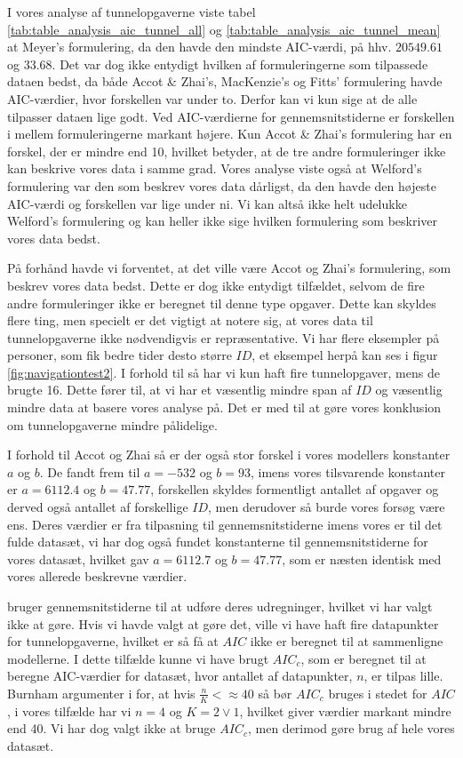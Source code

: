 I vores analyse af tunnelopgaverne viste tabel \ref{tab:table_analysis_aic_tunnel_all} og \ref{tab:table_analysis_aic_tunnel_mean} at Meyer's formulering, da den havde den mindste AIC-værdi, på hhv. $20549.61$ og $33.68$. Det var dog ikke entydigt hvilken af formuleringerne som tilpassede dataen bedst, da både Accot \& Zhai's, MacKenzie's og Fitts' formulering havde AIC-værdier, hvor forskellen var under to. Derfor kan vi kun sige at de alle tilpasser dataen lige godt. Ved AIC-værdierne for gennemsnitstiderne er forskellen i mellem formuleringerne markant højere. Kun Accot \& Zhai's formulering har en forskel, der er mindre end 10, hvilket betyder, at de tre andre formuleringer ikke kan beskrive vores data i samme grad. Vores analyse viste også at Welford's formulering var den som beskrev vores data dårligst, da den havde den højeste AIC-værdi og forskellen var lige under ni. Vi kan altså ikke helt udelukke Welford's formulering og kan heller ikke sige hvilken formulering som beskriver vores data bedst.

På forhånd havde vi forventet, at det ville være Accot og Zhai's formulering, som beskrev vores data bedst. Dette er dog ikke entydigt tilfældet, selvom de fire andre formuleringer ikke er beregnet til denne type opgaver. Dette kan skyldes flere ting, men specielt er det vigtigt at notere sig, at vores data til tunnelopgaverne ikke nødvendigvis er repræsentative. Vi har flere eksempler på personer, som fik bedre tider desto større $ID$, et eksempel herpå kan ses i figur \ref{fig:navigationtest2}. I forhold til \cite{accot1997} så har vi kun haft fire tunnelopgaver, mens de brugte 16. Dette fører til, at vi har et væsentlig mindre span af $ID$ og væsentlig mindre data at basere vores analyse på. Det er med til at gøre vores konklusion om tunnelopgaverne mindre pålidelige.

I forhold til Accot og Zhai så er der også stor forskel i vores modellers konstanter $a$ og $b$. De fandt frem til $a=-532$ og $b=93$, imens vores tilsvarende konstanter er $a=6112.4$ og $b=47.77$, forskellen skyldes formentligt antallet af opgaver og derved også antallet af forskellige $ID$, men derudover så burde vores forsøg være ens. Deres værdier er fra tilpasning til gennemsnitstiderne imens vores er til det fulde datasæt, vi har dog også fundet konstanterne til gennemsnitstiderne for vores datasæt, hvilket gav $a=6112.7$ og $b=47.77$, som er næsten identisk med vores allerede beskrevne værdier.

\cite{accot1997} bruger gennemsnitstiderne til at udføre deres udregninger, hvilket vi har valgt ikke at gøre. Hvis vi havde valgt at gøre det, ville vi have haft fire datapunkter for tunnelopgaverne, hvilket er så få at $AIC$ ikke er beregnet til at sammenligne modellerne. I dette tilfælde kunne vi have brugt $AIC_c$, som er beregnet til at beregne AIC-værdier for datasæt, hvor antallet af datapunkter, $n$, er tilpas lille. Burnham argumenter i \cite{burnham2004} for, at hvis $\frac{n}{K} <\approx 40$ så bør $AIC_c$ bruges i stedet for $AIC$, i vores tilfælde har vi $n=4$ og $K=2 \vee 1$, hvilket giver værdier markant mindre end 40. Vi har dog valgt ikke at bruge $AIC_c$, men derimod gøre brug af hele vores datasæt.

